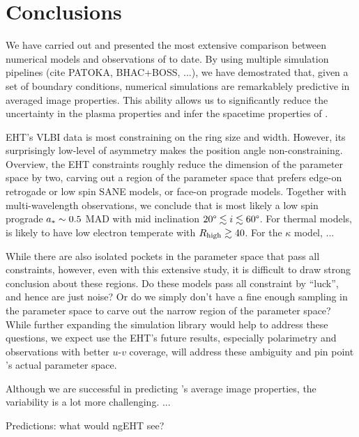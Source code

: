 \section{Conclusions}\label{sec:conclusions}


We have carried out and presented the most extensive comparison
between numerical models and observations of \sgra to date.
By using multiple simulation pipelines (cite PATOKA, BHAC+BOSS, ...),
we have demostrated that, given a set of boundary conditions,
numerical simulations are remarkablely predictive in averaged image
properties.
This ability allows us to significantly reduce the uncertainty in the
plasma properties and infer the spacetime properties of \sgra.

EHT's VLBI data is most constraining on the ring size and width.
However, its surprisingly low-level of asymmetry makes the position
angle non-constraining.
Overview, the EHT constraints roughly reduce the dimension of the
parameter space by two, carving out a region of the parameter space
that prefers edge-on retrogade or low spin SANE models, or face-on
prograde models.
Together with multi-wavelength observations, we conclude that \sgra is
most likely a low spin prograde $a_* \sim 0.5$ MAD with mid
inclination $20\degree \lesssim i \lesssim 60\degree$.
For thermal models, \sgra is likely to have low electron temperate
with $R_\mathrm{high} \gtrsim 40$.
For the $\kappa$ model, ...

While there are also isolated pockets in the parameter space that pass
all constraints, however, even with this extensive study, it is
difficult to draw strong conclusion about these regions.
Do these models pass all constraint by ``luck'', and hence are just noise?
Or do we simply don't have a fine enough sampling in the parameter space
to carve out the narrow region of the parameter space?
While further expanding the simulation library would help to address these
questions, we expect use the EHT's future results, especially polarimetry
and observations with better $u$-$v$ coverage, will address these ambiguity
and pin point \sgra's actual parameter space.

Although we are successful in predicting \sgra's average image
properties, the variability is a lot more challenging.
...

Predictions: what would ngEHT see?
